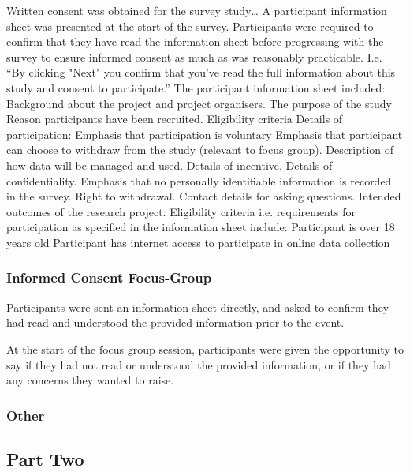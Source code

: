 \documentclass[manuscript,screen,review]{acmart}
\begin{document}
Written consent was obtained for the survey study…
A participant information sheet was presented at the start of the survey. Participants were required to confirm that they have read the information sheet before progressing with the survey to ensure informed consent as much as was reasonably practicable. 
I.e. “By clicking "Next" you confirm that you've read the full information about this study and consent to participate.”
The participant information sheet included:
Background about the project and project organisers.
The purpose of the study
Reason participants have been recruited. 
Eligibility criteria
Details of participation:
Emphasis that participation is voluntary
Emphasis that participant can choose to withdraw from the study (relevant to focus group).
Description of how data will be managed and used.
Details of incentive.
Details of confidentiality. 
Emphasis that no personally identifiable information is recorded in the survey. 
Right to withdrawal.
Contact details for asking questions. 
Intended outcomes of the research project.
Eligibility criteria i.e. requirements for participation as specified in the information sheet include:
Participant is over 18 years old
Participant has internet access to participate in online data collection

 
\subsubsection{Informed Consent Focus-Group}  


Participants were sent an information sheet directly, and asked to confirm they had read and understood the provided information prior to the event.

At the start of the focus group session, participants were given the opportunity to say if they had not read or understood the provided information, or if they had any concerns they wanted to raise. 

\subsubsection{Other}  







\subsection{Part Two}  
\end{document}
